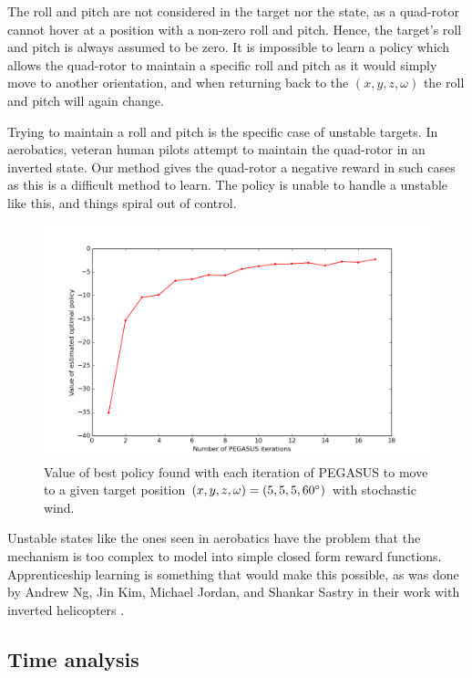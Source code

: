 \documentclass[hidelinks,BTech]{iitmdiss}
\begin{document}
The roll and pitch are not considered in the target nor the state, as a quad-rotor cannot hover at a position with a non-zero roll and pitch. Hence, the target's roll and pitch is always assumed to be zero. It is impossible to learn a policy which allows the quad-rotor to maintain a specific roll and pitch as it would simply move to another orientation, and when returning back to the $(x, y, z, \omega)$ the roll and pitch will again change.

Trying to maintain a roll and pitch is the specific case of unstable targets. In aerobatics, veteran human pilots attempt to maintain the quad-rotor in an inverted state. Our method gives the quad-rotor a negative reward in such cases as this is a difficult method to learn. The policy is unable to handle a unstable like this, and things spiral out of control.

\begin{figure}[H]
  \centering
    \includegraphics[width=\textwidth]{quadrotor_position_control_time.png}
    \caption{Value of best policy found with each iteration of PEGASUS to move to a given target position $(x, y, z, \omega) = (5, 5, 5, 60\protect^{\circ})$ with stochastic wind.}
\end{figure}

Unstable states like the ones seen in aerobatics have the problem that the mechanism is too complex to model into simple closed form reward functions. Apprenticeship learning is something that would make this possible, as was done by Andrew Ng, Jin Kim, Michael Jordan, and Shankar Sastry in their work with inverted helicopters \cite{InvertedHelicopterFlight}.

\subsection{Time analysis}
\end{document}

